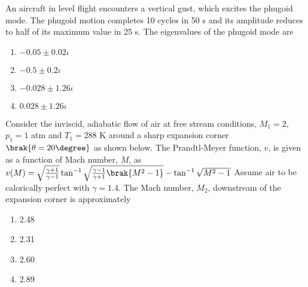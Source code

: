 \item An aircraft in level flight encounters a vertical gust, which excites the phugoid mode. The phugoid motion completes 10 cycles in 50 s and its amplitude reduces to half of its maximum value in 25 s. The eigenvalues of the phugoid mode are
\begin{multicols}{2}
    \begin{enumerate}
        \item $-0.05 \pm 0.02 \iota$
        \item $-0.5 \pm 0.2 \iota$
        \item $-0.028 \pm 1.26 \iota$
        \item $0.028 \pm 1.26 \iota$
    \end{enumerate}
\end{multicols}

\item Consider the inviscid, adiabatic flow of air at free stream conditions, $M_1 = 2$, $p_1 = 1$ atm and $T_1 = 288$ K around a sharp expansion corner $\brak{\theta = 20 \degree}$ as shown below. The Prandtl-Meyer function, $v$, is given as a function of Mach number, $M$, as $v(M) = \sqrt{\frac{\gamma + 1}{\gamma - 1}} \tan^{-1} \sqrt{\frac{\gamma - 1}{\gamma + 1}\brak{M^2 - 1}} - \tan^{-1} \sqrt{M^2 - 1}$
Assume air to be calorically perfect with $\gamma = 1.4$. The Mach number, $M_2$, downstream of the expansion corner is approximately
\centering
{}
\begin{multicols}{2}
    \begin{enumerate}
        \item 2.48
        \item 2.31
        \item 2.60
        \item 2.89
    \end{enumerate}
\end{multicols}

